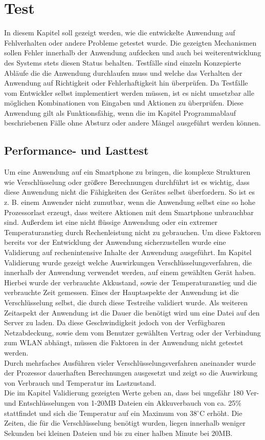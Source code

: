 \documentclass[10pt, a4paper,headsepline]{scrreprt}
\begin{document}
\chapter{Test}
In diesem Kapitel soll gezeigt werden, wie die entwickelte Anwendung auf Fehlverhalten oder andere Probleme getestet wurde. Die gezeigten Mechanismen sollen Fehler innerhalb der Anwendung aufdecken und auch bei weiterentwicklung des Systems stets diesen Status behalten. Testfälle sind einzeln Konzepierte Abläufe die die Anwendung durchlaufen muss und welche das Verhalten der Anwendung auf Richtigkeit oder Fehlerhaftigkeit hin überprüfen. Da Testfälle vom Entwickler selbst implementiert werden müssen, ist es nicht umsetzbar alle möglichen Kombinationen von Eingaben und Aktionen zu überprüfen. Diese Anwendung gilt als Funktionsfähig, wenn die im Kapitel Programmablauf beschriebenen Fälle ohne Absturz oder andere Mängel ausgeführt werden können.


\section{Performance- und Lasttest}
Um eine Anwendung auf ein Smartphone zu bringen, die komplexe Strukturen wie Verschlüsselung oder größere Berechnungen durchführt ist es wichtig, dass diese Anwendung nicht die Fähigkeiten des Gerätes selbst überfordern. So ist es z. B. einem Anwender nicht zumutbar, wenn die Anwendung selbst eine so hohe Prozessorlast erzeugt, dass weitere Aktionen mit dem Smartphone unbrauchbar sind. Außerdem ist eine nicht flüssige Anwendung oder ein extremer Temperaturanstieg durch Rechenleistung nicht zu gebrauchen. Um diese Faktoren bereits vor der Entwicklung der Anwendung sicherzustellen wurde eine Validierung auf rechenintensive Inhalte der Anwendung ausgeführt. Im Kapitel Validierung wurde gezeigt welche Auswirkungen Verschlüsselungsverfahren, die innerhalb der Anwendung verwendet werden, auf einem gewählten Gerät haben. Hierbei wurde der verbrauchte Akkustand, sowie der Temperaturanstieg und die verbrauchte Zeit gemessen. Eines der Hauptaspekte der Anwendung ist die Verschlüsselung selbst, die durch diese Testreihe validiert wurde. Als weiteren Zeitaspekt der Anwendung ist die Dauer die benötigt wird um eine Datei auf den Server zu laden. Da diese Geschwindigkeit jedoch von der Verfügbaren Netzabdeckung, sowie dem vom Benutzer gewählten Vertrag oder der Verbindung zum WLAN abhängt,  müssen die Faktoren in der Anwendung nicht getestet werden. \\
Durch mehrfaches Ausführen vieler Verschlüsselungsverfahren aneinander wurde der Prozessor dauerhaften Berechnungen ausgesetzt und zeigt so die Auswirkung von Verbrauch und Temperatur im Lastzustand. \\
Die im Kapitel Validierung gezeigten Werte geben an, dass bei ungefähr 180 Ver- und Entschlüsselungen von 1-20MB Dateien ein Akkuverbauch von ca. 25\% stattfindet und sich die Temperatur auf ein Maximum von 38$^\circ$C erhöht. Die Zeiten, die für die Verschlüsselung benötigt wurden, liegen innerhalb weniger Sekunden bei kleinen Dateien und bis zu einer halben Minute bei 20MB. 
\end{document}
